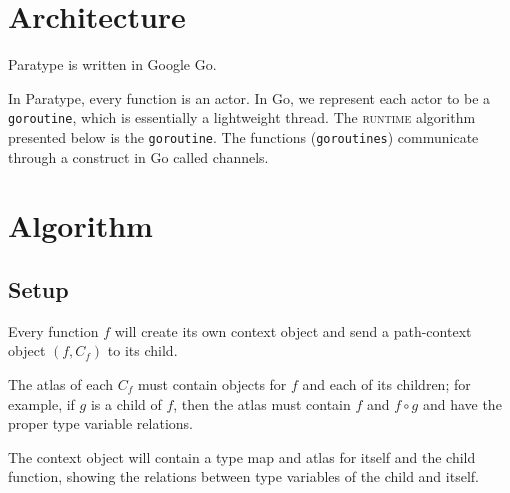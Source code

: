 \documentclass[10pt]{article}
\begin{document}
\section{Architecture}

Paratype is written in Google Go.

In Paratype, every function is an actor. In Go, we represent each actor to be a
\texttt{goroutine}, which is essentially a lightweight thread. The
\textsc{runtime} algorithm presented below is the \texttt{goroutine}. The
functions (\texttt{goroutines}) communicate through a construct in Go called
channels.

\pagebreak
\section{Algorithm}

\subsection{Setup}

Every function $f$ will create its own context object and send a path-context
object $(f, C_f)$ to its child.

The atlas of each $C_f$ must contain objects for $f$ and each of its
children; for example, if $g$ is a child of $f$, then the atlas must contain
$f$ and $f \circ g$ and have the proper type variable relations.

The context object will contain a type map and atlas for itself and the child
function, showing the relations between type variables of the child and itself.
\end{document}
